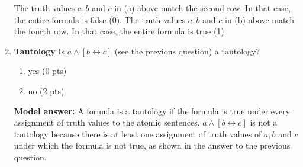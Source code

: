 \documentclass[a4,11pt]{article}
\newcommand{\6}{\mbox{$[\hspace*{-.6mm}[$}}
\newcommand{\9}{\mbox{$]\hspace*{-.6mm}]$}}
\begin{document}
\begin{enumerate}[leftmargin = 12pt]
The truth values $a, b$ and $c$ in (a) above match the second row. In that case, the entire formula is false (0). The truth values $a, b$ and $c$ in (b) above match the fourth row. In that case, the entire formula is true (1).

\item {\bf  Tautology} Is $a \wedge [b \leftrightarrow c]$ (see the previous question) a tautology?

\begin{enumerate}
\item yes (0 pts)
\item no (2 pts)
\end{enumerate}

{ \bf Model answer:}  A formula is a tautology if the formula is true under every assignment of truth values to the atomic sentences. $a \wedge [b \leftrightarrow c]$ is not a tautology because there is at least one assignment of truth values of $a, b$ and $c$ under which the formula is not true, as shown in the answer to the previous question.

\end{enumerate}
\end{document}
